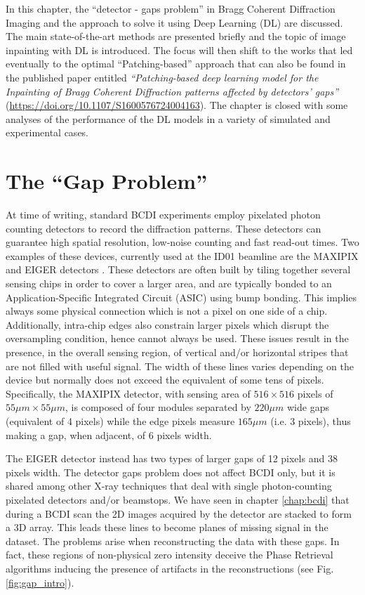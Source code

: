 
In this chapter, the ``detector - gaps problem'' in Bragg Coherent Diffraction Imaging and the approach to solve it
using Deep Learning (DL) are discussed. The main state-of-the-art methods are presented briefly and
the topic of image inpainting with DL is introduced. The focus will then shift to the works that led
eventually to the optimal ``Patching-based'' approach that can also be found in the published paper entitled
 \textit{``Patching-based deep learning model for the Inpainting of Bragg Coherent Diffraction patterns affected 
 by detectors' gaps''} (\url{https://doi.org/10.1107/S1600576724004163}). The chapter is closed with some analyses 
 of the performance of the DL models in a variety of simulated and experimental cases.  

\section{The ``Gap Problem''}\label{sec:gaps}

At time of writing, standard BCDI experiments employ pixelated photon counting detectors to record the diffraction
patterns. These detectors can guarantee high spatial resolution, low-noise counting and fast read-out times. Two examples 
of these devices, currently used at the ID01 beamline are the MAXIPIX and EIGER detectors \cite{ponchut_maxipix_2011, Eiger_Johnson_2014}.
These detectors are often built by tiling together several sensing chips in order to cover a larger area, and are
typically bonded to an Application-Specific Integrated Circuit (ASIC) using bump bonding. This implies always some 
physical connection which is not a pixel on one side of a chip. Additionally, intra-chip edges also constrain larger 
pixels which disrupt the oversampling condition, hence cannot always be used.
These issues result in the presence, in the overall sensing region, of vertical and/or horizontal stripes that are not 
filled with useful signal. The width of these lines varies depending on the device but normally does not exceed the equivalent 
of some tens of pixels. Specifically, the MAXIPIX detector, with sensing area of $516\times516$ pixels of 
$55\mu m\times55\mu m$, is composed of four modules separated by $220\mu m$ wide gaps (equivalent of 4 pixels) while the 
edge pixels measure $165\mu m$ (i.e. 3 pixels), thus making a gap, when adjacent, of 6 pixels width.

The EIGER detector instead has two types of larger gaps of 12 pixels and 38 pixels width.
The detector gaps problem does not affect BCDI only, but it is shared among other X-ray techniques that deal with single photon-counting
pixelated detectors and/or beamstops.
We have seen in chapter \ref{chap:bcdi} that during a BCDI scan the 2D images acquired by the detector are stacked to form
a 3D array. This leads these lines to become planes of missing signal in the dataset.
The problems arise when reconstructing the data with these gaps. In fact, these regions of non-physical zero intensity
deceive the Phase Retrieval algorithms inducing the presence of artifacts in the reconstructions \cite{carnis_towards_2019} (see Fig.\ref{fig:gap_intro}).

